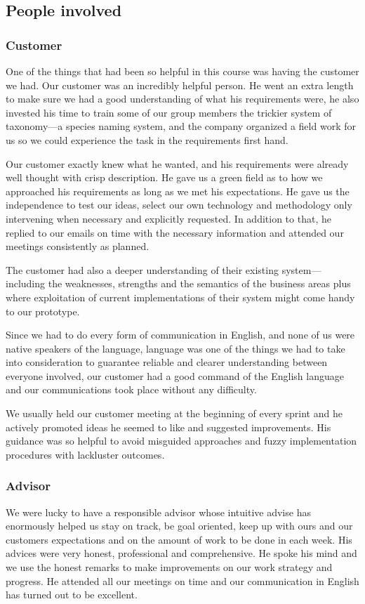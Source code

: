 \subsection{People involved}
	\subsubsection{Customer}
One of the things that had been so helpful in this course was having the customer we had. Our customer was an incredibly helpful person. He went an extra length to make sure we had a good understanding of what his requirements were, he also invested his time to train some of our group members the trickier system of taxonomy---a species naming system, and the company organized a field work for us so we could experience the task in the requirements first hand.

Our customer exactly knew what he wanted, and his requirements were already well thought with crisp description. He gave us a green field as to how we approached his requirements as long as we met his expectations. He gave us the independence to test our ideas, select our own technology and methodology only intervening when necessary and explicitly requested. In addition to that, he replied to our emails on time with the necessary information and attended our meetings consistently as planned.

The customer had also a deeper understanding of their existing system---including the weaknesses, strengths and the semantics of the business areas plus where exploitation of current implementations of their system might come handy to our prototype.

Since we had to do every form of communication in English, and none of us were native speakers of the language, language was one of the things we had to take into consideration to guarantee reliable and clearer understanding between everyone involved, our customer had a good command of the English language and our communications took place without any difficulty.

We usually held our customer meeting at the beginning of every sprint and he actively promoted ideas he seemed to like and suggested improvements.  His guidance was so helpful to avoid misguided approaches and fuzzy implementation procedures with lackluster outcomes.

	\subsubsection{Advisor}
We were lucky to have a responsible advisor whose intuitive advise has enormously helped us stay on track, be goal oriented, keep up with ours and our customers expectations and on the amount of work to be done in each week. His advices were very honest, professional and comprehensive. He spoke his mind and we use the honest remarks to make improvements on our work strategy and progress. He attended all our meetings on time and our communication in English has turned out to be excellent.

